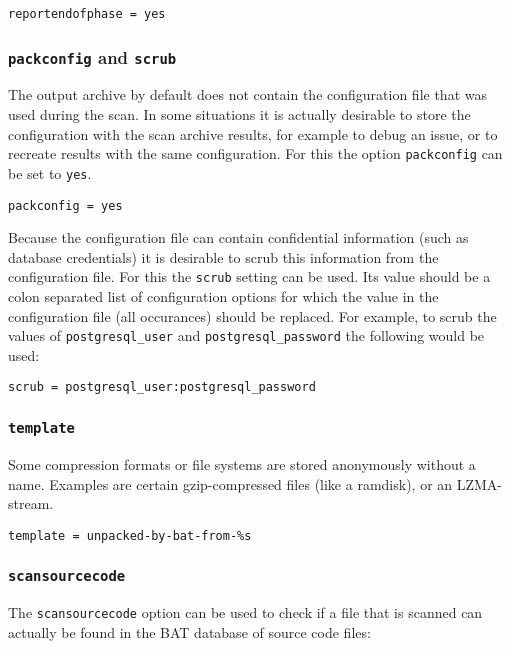 \documentclass[10pt,a4paper]{article}
\begin{document}
\begin{verbatim}
reportendofphase = yes
\end{verbatim}

\subsubsection{\texttt{packconfig} and \texttt{scrub}}

The output archive by default does not contain the configuration file that was
used during the scan. In some situations it is actually desirable to store the
configuration with the scan archive results, for example to debug an issue, or
to recreate results with the same configuration. For this the option
\texttt{packconfig} can be set to \texttt{yes}.

\begin{verbatim}
packconfig = yes
\end{verbatim}

Because the configuration file can contain confidential information (such as
database credentials) it is desirable to scrub this information from the
configuration file. For this the \texttt{scrub} setting can be used. Its value
should be a colon separated list of configuration options for which the value
in the configuration file (all occurances) should be replaced. For example, to
scrub the values of \texttt{postgresql\_user} and \texttt{postgresql\_password}
the following would be used:

\begin{verbatim}
scrub = postgresql_user:postgresql_password
\end{verbatim}

\subsubsection{\texttt{template}}

Some compression formats or file systems are stored anonymously without a name.
Examples are certain gzip-compressed files (like a ramdisk), or an LZMA-stream.

\begin{verbatim}
template = unpacked-by-bat-from-%s
\end{verbatim}

\subsubsection{\texttt{scansourcecode}}

The \texttt{scansourcecode} option can be used to check if a file that is
scanned can actually be found in the BAT database of source code files:
\end{document}
